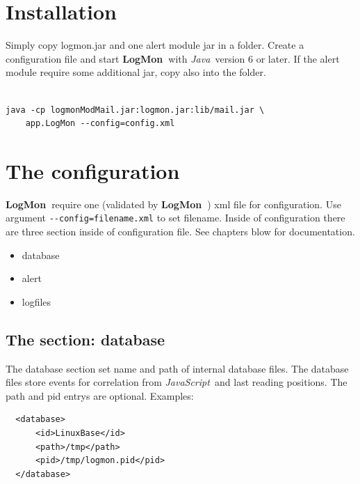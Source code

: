 \documentclass[11pt,a4paper]{article}
\newcommand{\logmon}{\textbf{LogMon\ }}
\newcommand{\js}{\textit{JavaScript\ }}
\newcommand{\java}{\textit{Java\ }}
\begin{document}
\section{Installation}

Simply copy logmon.jar and one alert module jar in a folder. Create a
configuration file and start \logmon with \java version 6 or later. If the
alert module require some additional jar, copy also into the folder.

\begin{verbatim}

java -cp logmonModMail.jar:logmon.jar:lib/mail.jar \
    app.LogMon --config=config.xml

\end{verbatim}

\section{The configuration}
\label{sec:conf}

\logmon require one (validated by \logmon) xml file for configuration. Use
argument \verb#--config=filename.xml# to set filename. Inside of
configuration there are three section inside of configuration file. See chapters
blow for documentation.

\begin{itemize}
  \item database
  \item alert
  \item logfiles
\end{itemize}

\subsection{The section: database}
\label{sec:cfgdb}

The database section set name and path of internal database files. The database files store events for
correlation from \js and last reading positions. The path and pid entrys are
optional. Examples:

\begin{verbatim}
  <database>
      <id>LinuxBase</id>
      <path>/tmp</path>
      <pid>/tmp/logmon.pid</pid>
  </database>
\end{verbatim}
\end{document}
